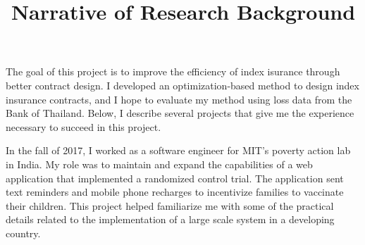 \documentclass[12pt]{article}
\title{Narrative of Research Background\vspace{-10ex}}
\date{}
\begin{document}
The goal of this project is to improve the efficiency of index isurance through better contract design. I developed an optimization-based method to design index insurance contracts, and I hope to evaluate my method using loss data from the Bank of Thailand. Below, I describe several  projects that give me the experience necessary to succeed in this project. 

In the fall of 2017, I worked as a software engineer for MIT’s poverty action lab in India. My role was to maintain and expand the capabilities of a web application that implemented a randomized control trial. The application sent text reminders and mobile phone recharges to incentivize families to vaccinate their children. This project helped familiarize me with some of the practical details related to the implementation of a large scale system in a developing country.

\end{document}
